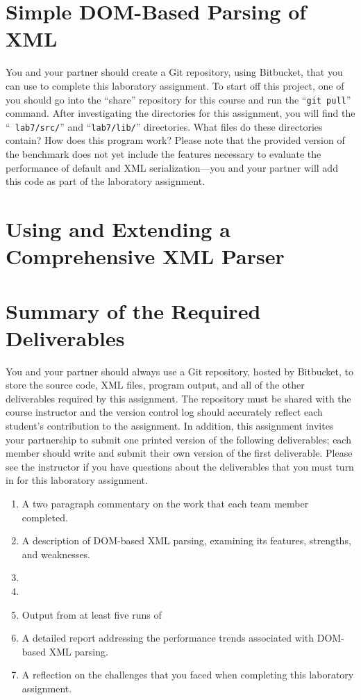 \section*{Simple DOM-Based Parsing of XML}

You and your partner should create a Git repository, using Bitbucket, that you can use to complete this laboratory
assignment.  To start off this project, one of you should go into the ``share'' repository for this course and run the
``{\tt git pull}'' command. After investigating the directories for this assignment, you will find the ``{\tt
  lab7/src/}'' and ``{\tt lab7/lib/}'' directories. What files do these directories contain? How does this program work?
Please note that the provided version of the benchmark does not yet include the features necessary to evaluate the
performance of default and XML serialization---you and your partner will add this code as part of the laboratory
assignment.


\vspace*{-.05in}
\section*{Using and Extending a Comprehensive XML Parser}



\section*{Summary of the Required Deliverables}

You and your partner should always use a Git repository, hosted by Bitbucket, to store the source code, XML files,
program output, and all of the other deliverables required by this assignment. The repository must be shared with the
course instructor and the version control log should accurately reflect each student's contribution to the assignment.
In addition, this assignment invites your partnership to submit one printed version of the following deliverables; each
member should write and submit their own version of the first deliverable. Please see the instructor if you have
questions about the deliverables that you must turn in for this laboratory assignment.

\vspace*{-.05in}
\begin{enumerate}
  \setlength{\itemsep}{0pt}
  \item A two paragraph commentary on the work that each team member completed. 
  \item A description of DOM-based XML parsing, examining its features, strengths, and weaknesses.
  \item 
  \item 
  \item Output from at least five runs of 
  \item A detailed report addressing the performance trends associated with DOM-based XML parsing.
  \item A reflection on the challenges that you faced when completing this laboratory assignment.
\end{enumerate}
\vspace*{-.05in}

